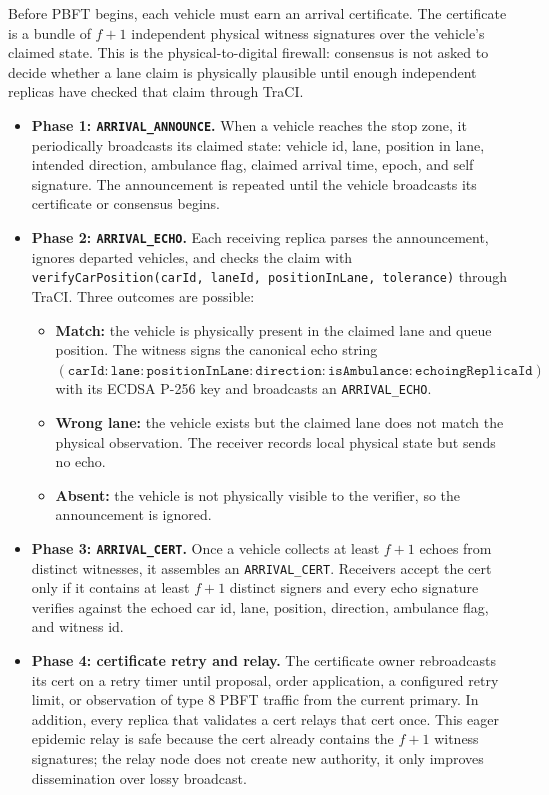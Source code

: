 \documentclass[fleqn,10pt]{olplainarticle}
\begin{document}
Before PBFT begins, each vehicle must earn an arrival certificate. The certificate is a bundle of $f+1$ independent physical witness signatures over the vehicle's claimed state. This is the physical-to-digital firewall: consensus is not asked to decide whether a lane claim is physically plausible until enough independent replicas have checked that claim through TraCI.

\begin{itemize}
    \item \textbf{Phase 1: \texttt{ARRIVAL\_ANNOUNCE}.} When a vehicle reaches the stop zone, it periodically broadcasts its claimed state: vehicle id, lane, position in lane, intended direction, ambulance flag, claimed arrival time, epoch, and self signature. The announcement is repeated until the vehicle broadcasts its certificate or consensus begins.
    \item \textbf{Phase 2: \texttt{ARRIVAL\_ECHO}.} Each receiving replica parses the announcement, ignores departed vehicles, and checks the claim with \texttt{verifyCarPosition(carId, laneId, positionInLane, tolerance)} through TraCI. Three outcomes are possible:
    \begin{itemize}
        \item \textbf{Match:} the vehicle is physically present in the claimed lane and queue position. The witness signs the canonical echo string $(\texttt{carId}:\texttt{lane}:\texttt{positionInLane}:\texttt{direction}:\texttt{isAmbulance}:\texttt{echoingReplicaId})$ with its ECDSA P-256 key and broadcasts an \texttt{ARRIVAL\_ECHO}.
        \item \textbf{Wrong lane:} the vehicle exists but the claimed lane does not match the physical observation. The receiver records local physical state but sends no echo.
        \item \textbf{Absent:} the vehicle is not physically visible to the verifier, so the announcement is ignored.
    \end{itemize}
    \item \textbf{Phase 3: \texttt{ARRIVAL\_CERT}.} Once a vehicle collects at least $f+1$ echoes from distinct witnesses, it assembles an \texttt{ARRIVAL\_CERT}. Receivers accept the cert only if it contains at least $f+1$ distinct signers and every echo signature verifies against the echoed car id, lane, position, direction, ambulance flag, and witness id.
    \item \textbf{Phase 4: certificate retry and relay.} The certificate owner rebroadcasts its cert on a retry timer until proposal, order application, a configured retry limit, or observation of type 8 PBFT traffic from the current primary. In addition, every replica that validates a cert relays that cert once. This eager epidemic relay is safe because the cert already contains the $f+1$ witness signatures; the relay node does not create new authority, it only improves dissemination over lossy broadcast.

\end{itemize}
\end{document}
